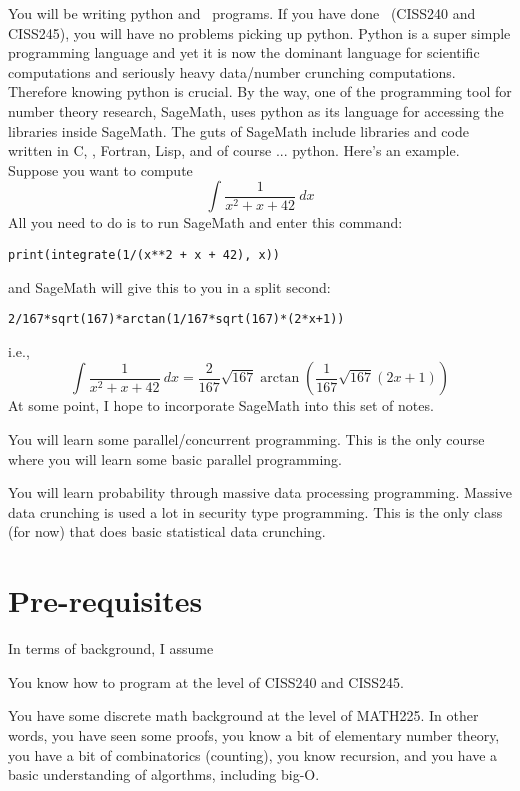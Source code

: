 \begin{itemize}
  \li
  You will be writing python and \cpp\ programs.
  If you have done \cpp\ (CISS240 and CISS245), you will have no problems
  picking up python.
  Python is a super simple programming language and yet
  it is now the dominant language for scientific computations
  and seriously heavy data/number crunching computations.
  Therefore knowing python is crucial.
  By the way, one of the programming tool for number theory
  research, SageMath, uses python as its language for
  accessing the libraries inside SageMath.
  The guts of SageMath include libraries and
  code written in C, \cpp, Fortran, Lisp,
  and of course ... python.
  Here's an example.
  Suppose you want to compute
  \[
  \int \frac{1}{x^2 + x + 42} \ dx
  \]
  All you need to do is to run SageMath and enter this command:
  \begin{Verbatim}[frame=single, fontsize=\small]
print(integrate(1/(x**2 + x + 42), x))
  \end{Verbatim}
  and SageMath will give this to you in a split second:
  \begin{Verbatim}[frame=single, fontsize=\small]
2/167*sqrt(167)*arctan(1/167*sqrt(167)*(2*x+1))
  \end{Verbatim}
  i.e.,
  \[
  \int \frac{1}{x^2 + x + 42} \ dx
  =
  \frac{2}{167} \sqrt{167} \arctan \left( \frac{1}{167}\sqrt{167}(2x + 1) \right)
  \]
  At some point,
  I hope to incorporate SageMath into this set of notes.

  \li You will learn some parallel/concurrent programming.
  This is the only course where you will learn some basic
  parallel programming.

  \li
  You will learn probability through massive data processing programming.
  Massive data crunching is used a lot in security type programming.
  This is the only class (for now) that does basic statistical
  data crunching.
  
\end{itemize}

\section{Pre-requisites}

In terms of background, I assume
\begin{itemize}

  \li You know how to program at the level of CISS240 and CISS245.

  \li You have some discrete math background at the level of MATH225.
  In other words, you have seen some proofs,
  you know a bit of elementary number theory,
  you have a bit of combinatorics (counting),
  you know recursion, and
  you have a basic understanding of algorthms, including big-O.
  
\end{itemize}

